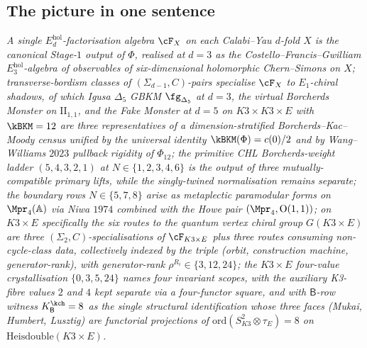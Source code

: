 \subsection{The picture in one sentence}
\label{wn:subsec:second-pass-one-line}

\emph{A single $E_d^{\mathrm{hol}}$-factorisation algebra
$\cF_X$ on each Calabi--Yau $d$-fold $X$ is the canonical Stage-$1$
output of $\Phi$, realised at $d = 3$ as the Costello--Francis--Gwilliam
$E_3^{\mathrm{hol}}$-algebra of observables of six-dimensional
holomorphic Chern--Simons on $X$; transverse-bordism classes of
$(\Sigma_{d-1}, C)$-pairs specialise $\cF_X$ to $E_1$-chiral shadows,
of which Igusa $\Delta_5$ GBKM $\fg_{\Delta_5}$ at $d = 3$, the virtual
Borcherds Monster on $\mathrm{II}_{1, 1}$, and the Fake Monster at
$d = 5$ on $K3 \times K3 \times E$ with $\kBKM = 12$ are three
representatives of a dimension-stratified Borcherds--Kac--Moody census
unified by the universal identity $\kBKM(\Phi) = c(0)/2$ and by
Wang--Williams $2023$ pullback rigidity of $\Phi_{12}$; the primitive
CHL Borcherds-weight ladder $(5, 4, 3, 2, 1)$ at
$N \in \{1, 2, 3, 4, 6\}$ is the output of three mutually-compatible
primary lifts, while the singly-twined normalisation remains separate;
the boundary rows $N \in \{5, 7, 8\}$ arise
as metaplectic paramodular forms on $\Mpr_4(\mathbb{A})$ via
Niwa $1974$ combined with the Howe pair $(\Mpr_4, \mathrm{O}(1, 1))$;
on $K3 \times E$ specifically the six routes to the quantum vertex
chiral group $G(K3 \times E)$ are three $(\Sigma_2, C)$-specialisations
of $\cF_{K3 \times E}$ plus three routes consuming non-cycle-class data,
collectively indexed by the triple (orbit, construction machine,
generator-rank), with generator-rank $\rho^{R_i} \in \{3, 12, 24\}$;
the $K3\times E$ four-value crystallisation $\{0, 3, 5, 24\}$ names
four invariant scopes, with the auxiliary K3-fibre values $2$ and $4$
kept separate via a four-functor square, and with $\mathsf{B}$-row witness
$K^{\kch}_{\mathsf{B}} = 8$ as the single structural identification
whose three faces (Mukai, Humbert, Lusztig) are functorial projections
of $\mathrm{ord}(S_{K3}^2 \otimes \tau_E) = 8$ on
$\mathrm{Heisdouble}(K3 \times E)$.}



